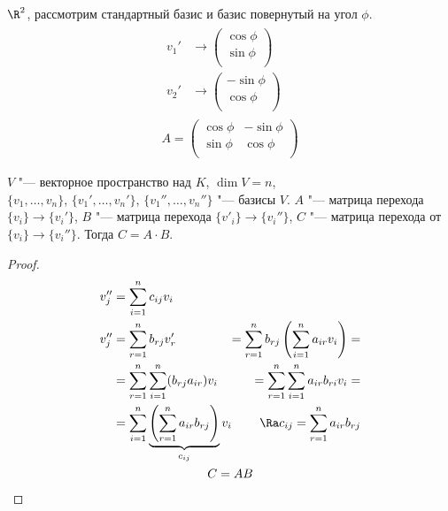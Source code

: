 \begin{exmp}
	$\R^2$, рассмотрим стандартный базис и базис повернутый на угол $\phi$.
	\begin{gather*}
		\begin{aligned}
			v_1' &\to
				\begin{pmatrix}
					\cos \phi\\
					\sin \phi\\
				\end{pmatrix} \\
			v_2' &\to
				\begin{pmatrix}
					-\sin \phi\\
					\cos \phi\\
				\end{pmatrix}
		\end{aligned} \\
		A =
		\begin{pmatrix}
			\cos \phi & -\sin \phi\\
			\sin \phi & \cos \phi\\
		\end{pmatrix}
	\end{gather*}
\end{exmp}

\begin{theorem}
	$V$ "--- векторное пространство над $K$, $\dim V = n$,\\
	$\{v_1, \dots, v_n\}$, $\{v_1', \dots, v_n'\}$, $\{v_1'', \dots, v_n''\}$  "--- базисы $V$.
	$A$ "--- матрица перехода $\{v_i\} \to \{v_i'\}$,
	$B$ "--- матрица перехода $\{v'_i\} \to \{v_i''\}$,
	$C$ "--- матрица перехода от $\{v_i\} \to \{v_i''\}$.
	Тогда $C = A \cdot B$.
\end{theorem}
\begin{proof}
	\begin{gather*}
		\begin{alignedat}{3}
			v_j'' &= \sum_{i = 1}^{n}c_{ij}v_i &\\
			v_j'' &= \sum_{r = 1}^{n}b_{rj}v_r' &= \sum_{r = 1}^{n}b_{rj}\left(\sum_{i = 1}^{n}a_{ir}v_i\right) = \\
			      &= \sum_{r = 1}^{n}\sum_{i = 1}^{n}(b_{rj}a_{ir})v_i &= \sum_{r = 1}^{n}\sum_{i = 1}^{n}a_{ir}b_{ri}v_i = \\
			      &= \sum_{i = 1}^{n}\underbrace{\left(\sum_{r = 1}^{n}a_{ir} b_{rj}\right)}_{c_{ij}} v_i
			        &\Ra c_{ij} = \sum_{r = 1}^{n}a_{ir}b_{rj}
		\end{alignedat} \\
		C = AB
	\end{gather*}
\end{proof}

